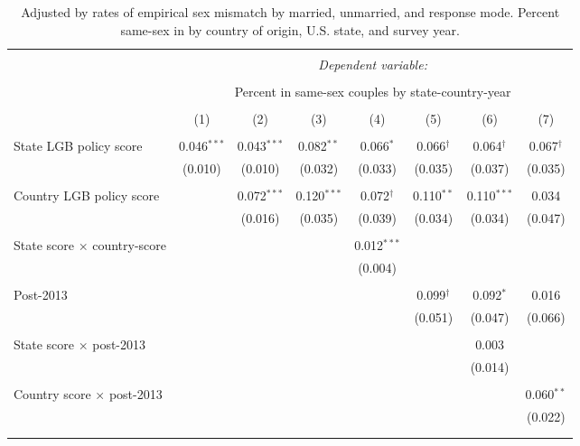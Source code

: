 \documentclass[
  11pt,
]{article}
\begin{document}
\begin{table}[H] \centering 
  \caption{Adjusted by rates of empirical sex mismatch by married, unmarried, and response mode. Percent same-sex in by country of origin, U.S. state, and survey year.} 
  \label{tab:state-props-adj} 
\begin{tabular}{@{\extracolsep{5pt}}lccccccc} 
\\[-1.8ex]\hline 
\hline \\[-1.8ex] 
 & \multicolumn{7}{c}{\textit{Dependent variable:}} \\ 
\cline{2-8} 
\\[-1.8ex] & \multicolumn{7}{c}{Percent in same-sex couples by state-country-year} \\ 
\\[-1.8ex] & (1) & (2) & (3) & (4) & (5) & (6) & (7)\\ 
\hline \\[-1.8ex] 
 State LGB policy score & 0.046$^{***}$ & 0.043$^{***}$ & 0.082$^{**}$ & 0.066$^{*}$ & 0.066$^{†}$ & 0.064$^{†}$ & 0.067$^{†}$ \\ 
  & (0.010) & (0.010) & (0.032) & (0.033) & (0.035) & (0.037) & (0.035) \\ 
  & & & & & & & \\ 
 Country LGB policy score &  & 0.072$^{***}$ & 0.120$^{***}$ & 0.072$^{†}$ & 0.110$^{**}$ & 0.110$^{***}$ & 0.034 \\ 
  &  & (0.016) & (0.035) & (0.039) & (0.034) & (0.034) & (0.047) \\ 
  & & & & & & & \\ 
 State score × country-score &  &  &  & 0.012$^{***}$ &  &  &  \\ 
  &  &  &  & (0.004) &  &  &  \\ 
  & & & & & & & \\ 
 Post-2013 &  &  &  &  & 0.099$^{†}$ & 0.092$^{*}$ & 0.016 \\ 
  &  &  &  &  & (0.051) & (0.047) & (0.066) \\ 
  & & & & & & & \\ 
 State score × post-2013 &  &  &  &  &  & 0.003 &  \\ 
  &  &  &  &  &  & (0.014) &  \\ 
  & & & & & & & \\ 
 Country score × post-2013 &  &  &  &  &  &  & 0.060$^{**}$ \\ 
  &  &  &  &  &  &  & (0.022) \\ 
  & & & & & & & \\ 
\hline \\[-1.8ex] 

\end{tabular}
\end{table}
\end{document}
